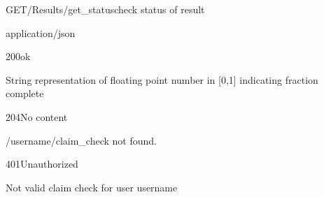 \documentclass[12pt, etter]{article}
\begin{document}
\begin{apiRoute}{GET}{/Results/get\_status}{check status of result}
    \begin{routeParameter}
    \end{routeParameter}
    \begin{routeResponse}{application/json}
        \begin{routeResponseItem}{200}{ok}
            \begin{routeResponseItemBody}
                String representation of floating point number in [0,1] indicating fraction complete
            \end{routeResponseItemBody}
        \end{routeResponseItem}
        \begin{routeResponseItem}{204}{No content}
            \begin{routeResponseItemBody}
                /{username}/{claim_check} not found.
            \end{routeResponseItemBody}
        \end{routeResponseItem}
        \begin{routeResponseItem}{401}{Unauthorized}
            \begin{routeResponseItemBody}
                Not valid claim check for user {username}
            \end{routeResponseItemBody}
        \end{routeResponseItem}
    \end{routeResponse}
\end{apiRoute}
\end{document}
